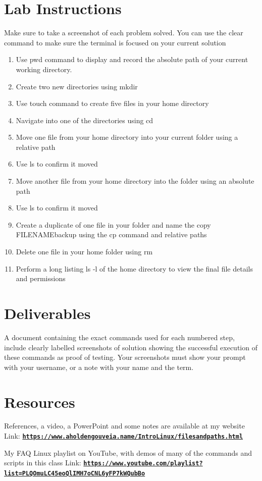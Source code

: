 \documentclass[12pt]{article}
\begin{document}
\section*{Lab Instructions}
Make sure to take a screenshot of each problem solved.  You can use the clear command to make sure the terminal is focused on your current solution
    \begin{enumerate}
        \item Use pwd command to display and record the absolute path of your current working directory.
        \item Create two new directories using mkdir
        \item Use touch command to create five files in your home directory
        \item Navigate into one of the  directories using cd 
        \item Move one file from your home directory into your current folder using a relative path
        \item Use ls to confirm it moved
        \item Move another file from your home directory into the folder using an absolute path
        \item Use ls to confirm it moved
        \item Create a duplicate of one file in your folder and name the copy FILENAMEbackup using the cp command and relative paths
        \item Delete one file in your home folder using rm
        \item Perform a long listing ls -l of the home directory to view the final file details and permissions
    \end{enumerate}


\section*{Deliverables}
A document containing the exact commands used for each numbered step, include clearly labelled screenshots of solution showing the successful execution of these commands as proof of testing. Your screenshots must show your prompt with your username, or a note with your name and the term.
\section*{Resources}
References, a video, a PowerPoint and some notes are available at my website
Link: \href{https://www.aholdengouveia.name/IntroLinux/filesandpaths.html}{\textbf{\nolinkurl{https://www.aholdengouveia.name/IntroLinux/filesandpaths.html}}}

My FAQ Linux playlist on YouTube, with demos of many of the commands and scripts in this class
Link: \href{https://www.youtube.com/playlist?list=PLQOmuLC45eoQlIMH7oCNL6yFP7kWQubBo}{\textbf{\nolinkurl{https://www.youtube.com/playlist?list=PLQOmuLC45eoQlIMH7oCNL6yFP7kWQubBo}}}
\end{document}
